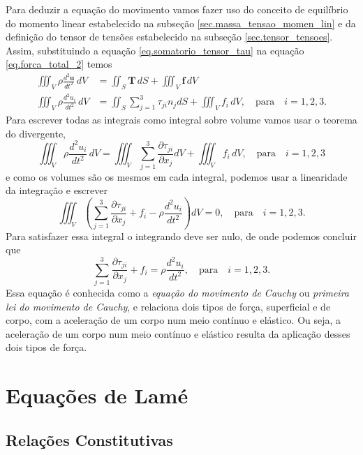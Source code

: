 Para deduzir a equa\c{c}\~ao do movimento vamos fazer uso do conceito de equil\'ibrio do momento linear estabelecido na subse\c{c}\~ao \ref{sec.massa_tensao_momen_lin} e da defini\c{c}\~ao do tensor de tens\~oes estabelecido na subse\c{c}\~ao \ref{sec.tensor_tensoes}. Assim, substituindo a equa\c{c}\~ao \ref{eq.somatorio_tensor_tau} na equa\c{c}\~ao \ref{eq.forca_total_2} temos
\begin{align*}
\iiint_V\rho\frac{d^2\mathbf{u}}{dt^2}\,dV&=\iint_S\mathbf{T}\,dS+\iiint_V\mathbf{f}\,dV\\
\iiint_V\rho\frac{d^2u_i}{dt^2}\,dV&=\iint_S\sum_{j=1}^3\tau_{ji}n_jdS+\iiint_Vf_i\,dV,\quad \text{para}\quad i=1,2,3.
\end{align*}
Para escrever todas as integrais como integral sobre volume vamos usar o teorema do divergente,
\begin{equation}\label{eq.movi_cauchy_integral}
\iiint_V\rho\frac{d^2u_i}{dt^2}\,dV=\iiint_V\sum_{j=1}^3\frac{\partial\tau_{ji}}{\partial x_j}dV+\iiint_Vf_i\,dV,\quad \text{para}\quad i=1,2,3
\end{equation}
e como os volumes s\~ao os mesmos em cada integral, podemos usar a linearidade da integra\c{c}\~ao e escrever
\begin{equation}
\iiint_V\left(\sum_{j=1}^3\frac{\partial\tau_{ji}}{\partial x_j}+f_i-\rho\frac{d^2u_i}{dt^2}\right)dV=0,\quad \text{para}\quad i=1,2,3.
\end{equation}
Para satisfazer essa integral o integrando deve ser nulo, de onde podemos concluir que
\begin{equation}
\sum_{j=1}^3\frac{\partial\tau_{ji}}{\partial x_j}+f_i=\rho\frac{d^2u_i}{dt^2},\quad \text{para}\quad i=1,2,3.
\end{equation}
Essa equa\c{c}\~ao \'e conhecida como a \textit{equa\c{c}\~ao do movimento de Cauchy} ou \textit{primeira lei do movimento de Cauchy}, e relaciona dois tipos de for\c{c}a, superficial e de corpo, com a acelera\c{c}\~ao de um corpo num meio cont\'inuo e el\'astico. Ou seja, a acelera\c{c}\~ao de um corpo num meio cont\'inuo e el\'astico resulta da aplica\c{c}\~ao desses dois tipos de for\c{c}a.

  
\section{Equações de Lamé}
\subsection{Rela\c{c}\~oes Constitutivas}\label{sec.rela-const-hooke}

